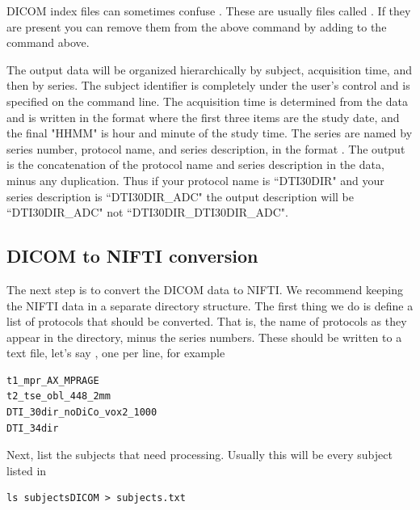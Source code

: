 \documentclass{InsightArticle}
\begin{document}
DICOM index files can sometimes confuse . These are usually files called . If they are present you can remove them from the above command by adding  to the  command above.

The output data will be organized hierarchically by subject, acquisition time, and then by series. The subject identifier is completely under the user's control and is specified on the command line. The acquisition time is determined from the data and is written in the format  where the first three items are the study date, and the final "HHMM" is hour and minute of the study time. The series are named by series number, protocol name, and series description, in the format . The output  is the concatenation of the protocol name and series description in the data, minus any duplication. Thus if your protocol name is ``DTI30DIR" and your series description is ``DTI30DIR\_ADC" the output description will be ``DTI30DIR\_ADC" not ``DTI30DIR\_DTI30DIR\_ADC".


\subsection{DICOM to NIFTI conversion}

The next step is to convert the DICOM data to NIFTI. We recommend keeping the NIFTI data in a separate directory structure. The first thing we do is define a list of protocols that should be converted. That is, the name of protocols as they appear in the  directory, minus the series numbers. These should be written to a text file, let's say , one per line, for example
\begin{lstlisting}[style=bash]
t1_mpr_AX_MPRAGE
t2_tse_obl_448_2mm
DTI_30dir_noDiCo_vox2_1000
DTI_34dir
\end{lstlisting}

Next, list the subjects that need processing. Usually this will be every subject listed in 
\begin{lstlisting}[style=bash]
  ls subjectsDICOM > subjects.txt  
\end{lstlisting}
\end{document}
